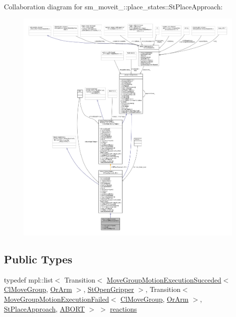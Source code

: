 Collaboration diagram for sm\+\_\+moveit\+\_\+:\+:place\+\_\+states\+:\+:St\+Place\+Approach\+:
\nopagebreak
\begin{figure}[H]
\begin{center}
\leavevmode
\includegraphics[width=350pt]{structsm__moveit__3_1_1place__states_1_1StPlaceApproach__coll__graph}
\end{center}
\end{figure}
\subsection*{Public Types}
\begin{DoxyCompactItemize}
\item 
typedef mpl\+::list$<$ Transition$<$ \hyperlink{structmoveit__z__client_1_1MoveGroupMotionExecutionSucceded}{Move\+Group\+Motion\+Execution\+Succeded}$<$ \hyperlink{classmoveit__z__client_1_1ClMoveGroup}{Cl\+Move\+Group}, \hyperlink{classsm__moveit__3_1_1OrArm}{Or\+Arm} $>$, \hyperlink{structsm__moveit__3_1_1place__states_1_1StOpenGripper}{St\+Open\+Gripper} $>$, Transition$<$ \hyperlink{structmoveit__z__client_1_1MoveGroupMotionExecutionFailed}{Move\+Group\+Motion\+Execution\+Failed}$<$ \hyperlink{classmoveit__z__client_1_1ClMoveGroup}{Cl\+Move\+Group}, \hyperlink{classsm__moveit__3_1_1OrArm}{Or\+Arm} $>$, \hyperlink{structsm__moveit__3_1_1place__states_1_1StPlaceApproach}{St\+Place\+Approach}, \hyperlink{classABORT}{A\+B\+O\+RT} $>$ $>$ \hyperlink{structsm__moveit__3_1_1place__states_1_1StPlaceApproach_ae2448d9da357985f7a96a58bc4bea1e2}{reactions}
\end{DoxyCompactItemize}
